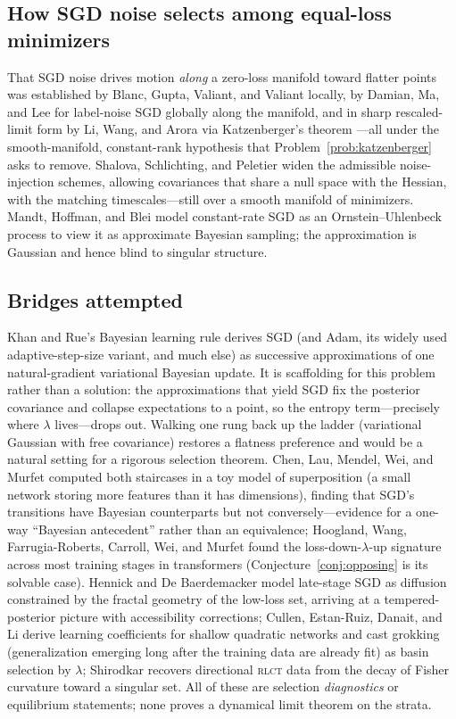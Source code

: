 \documentclass[11pt]{amsart}
\theoremstyle{plain}
\theoremstyle{definition}
\begin{document}
\subsection*{How SGD noise selects among equal-loss minimizers}
That SGD noise drives motion \emph{along} a zero-loss manifold toward flatter points was established by Blanc, Gupta, Valiant, and Valiant \cite{blanc2020} locally, by Damian, Ma, and Lee \cite{damian2021} for label-noise SGD globally along the manifold, and in sharp rescaled-limit form by Li, Wang, and Arora \cite{liwangarora2022} via Katzenberger's theorem \cite{katzenberger1991}---all under the smooth-manifold, constant-rank hypothesis that Problem~\ref{prob:katzenberger} asks to remove. Shalova, Schlichting, and Peletier \cite{shalova2024} widen the admissible noise-injection schemes, allowing covariances that share a null space with the Hessian, with the matching timescales---still over a smooth manifold of minimizers. Mandt, Hoffman, and Blei \cite{mandt2017} model constant-rate SGD as an Ornstein--Uhlenbeck process to view it as approximate Bayesian sampling; the approximation is Gaussian and hence blind to singular structure.

\subsection*{Bridges attempted}
Khan and Rue's Bayesian learning rule \cite{khan2023} derives SGD (and Adam, its widely used adaptive-step-size variant, and much else) as successive approximations of one natural-gradient variational Bayesian update. It is scaffolding for this problem rather than a solution: the approximations that yield SGD fix the posterior covariance and collapse expectations to a point, so the entropy term---precisely where $\lambda$ lives---drops out. Walking one rung back up the ladder (variational Gaussian with free covariance) restores a flatness preference and would be a natural setting for a rigorous selection theorem. Chen, Lau, Mendel, Wei, and Murfet \cite{chen2023} computed both staircases in a toy model of superposition (a small network storing more features than it has dimensions), finding that SGD's transitions have Bayesian counterparts but not conversely---evidence for a one-way ``Bayesian antecedent'' rather than an equivalence; Hoogland, Wang, Farrugia-Roberts, Carroll, Wei, and Murfet \cite{hoogland2024} found the loss-down-$\lambda$-up signature across most training stages in transformers (Conjecture~\ref{conj:opposing} is its solvable case). Hennick and De Baerdemacker \cite{hennick2025} model late-stage SGD as diffusion constrained by the fractal geometry of the low-loss set, arriving at a tempered-posterior picture with accessibility corrections; Cullen, Estan-Ruiz, Danait, and Li \cite{cullen2026} derive learning coefficients for shallow quadratic networks and cast grokking (generalization emerging long after the training data are already fit) as basin selection by $\lambda$; Shirodkar \cite{shirodkar2026} recovers directional \textsc{rlct} data from the decay of Fisher curvature toward a singular set. All of these are selection \emph{diagnostics} or equilibrium statements; none proves a dynamical limit theorem on the strata.
\end{document}
